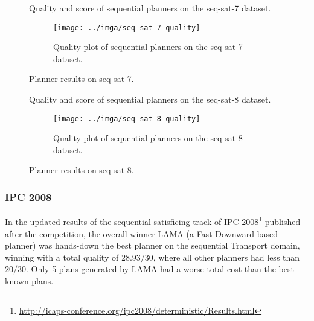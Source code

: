 \begin{figure}[tbp]
\centering
\begin{subtable}{\textwidth}
\centering
\scriptsize
\renewcommand{\footnotesize}{\scriptsize}

\caption{Quality and score of sequential planners on the seq-sat-7 dataset.}
\label{tab:seq-sat-7-ipc-scores}
\end{subtable}

\vspace{0.5cm}
\begin{subfigure}{\textwidth}
\centering
\texttt{[image: ../imga/seq-sat-7-quality]}
\caption{Quality plot of sequential planners on the seq-sat-7 dataset.}
\label{fig:seq-sat-7-quality}
\end{subfigure}
\caption{Planner results on seq-sat-7.}
\label{fig:seq-sat-7-results}
\end{figure}

\begin{figure}[tbp]
\centering
\begin{subtable}{\textwidth}
\centering
\scriptsize
\renewcommand{\footnotesize}{\scriptsize}

\caption{Quality and score of sequential planners on the seq-sat-8 dataset.}
\label{tab:seq-sat-8-ipc-scores}
\end{subtable}

\vspace{0.5cm}
\begin{subfigure}{\textwidth}
\centering
\texttt{[image: ../imga/seq-sat-8-quality]}
\caption{Quality plot of sequential planners on the seq-sat-8 dataset.}
\label{fig:seq-sat-8-quality}
\end{subfigure}
\caption{Planner results on seq-sat-8.}
\label{fig:seq-sat-8-results}
\end{figure}



\subsubsection{IPC 2008}

In the updated results of the sequential satisficing track of IPC 2008\footnote{\url{http://icaps-conference.org/ipc2008/deterministic/Results.html}} published after the competition,
the overall winner LAMA (a Fast Downward based planner)
was hands-down the best planner on the sequential Transport domain, winning
with a total quality of $28.93/30$, where all other planners had less than $20/30$.
Only 5 plans generated by LAMA had a worse total cost than the best known plans.

